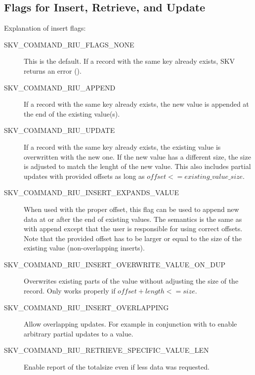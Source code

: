 
\subsection{Flags for Insert, Retrieve, and Update}\label{sec:api:RIU:flags}
Explanation of insert flags:  
\begin{description}
\item[SKV\_COMMAND\_RIU\_FLAGS\_NONE] This is the default.  If a
  record with the same key already exists, SKV returns an error
  ().
\item[SKV\_COMMAND\_RIU\_APPEND] If a record with the same key
  already exists, the new value is appended at the end of the existing
  value(s).
\item[SKV\_COMMAND\_RIU\_UPDATE] If a record with the same key already
  exists, the existing value is overwritten with the new one.  If the
  new value has a different size, the size is adjusted to match the
  lenght of the new value.  This also includes partial updates with
  provided offsets as long as $offset <= existing\_value\_size$.
\item[SKV\_COMMAND\_RIU\_INSERT\_EXPANDS\_VALUE] When used with the
  proper offset, this flag can be used to append new data at or after
  the end of existing values.  The semantics is the same as with
  append except that the user is responsible for using correct
  offsets.  Note that the provided offset has to be larger or equal to
  the size of the existing value (non-overlapping inserts).
\item[SKV\_COMMAND\_RIU\_INSERT\_OVERWRITE\_VALUE\_ON\_DUP] Overwrites
  existing parts of the value without adjusting the size of the
  record.  Only works properly if $offset + length <= size$.
\item[SKV\_COMMAND\_RIU\_INSERT\_OVERLAPPING] Allow overlapping
  updates. For example in conjunction with
   to enable arbitrary
  partial updates to a value.
\item[SKV\_COMMAND\_RIU\_RETRIEVE\_SPECIFIC\_VALUE\_LEN] Enable report of
  the totalsize even if less data was requested.
\end{description}


